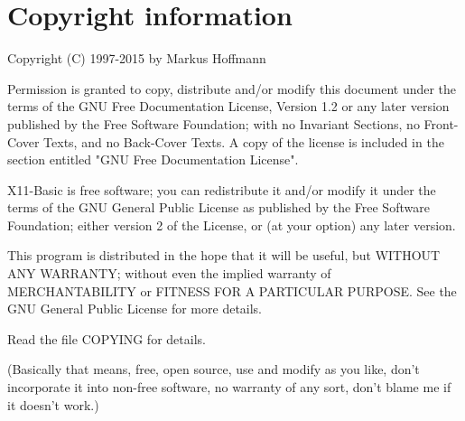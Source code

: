 \section*{Copyright information}

Copyright (C) 1997-2015 by Markus Hoffmann 

Permission is granted to copy, distribute and/or modify this document
under the terms of the GNU Free Documentation License, Version 1.2
or any later version published by the Free Software Foundation;
with no Invariant Sections, no Front-Cover Texts, and no Back-Cover Texts.
A copy of the license is included in the section entitled "GNU
Free Documentation License".

X11-Basic is free software; you can redistribute it and/or modify it under the
terms of the GNU General Public License as published by the Free Software
Foundation; either version 2 of the License, or (at your option) any later
version.

This program is distributed in the hope that it will be useful, but WITHOUT ANY
WARRANTY; without even the implied warranty of MERCHANTABILITY or FITNESS FOR
A PARTICULAR PURPOSE. See the GNU General Public License for more details.

Read the file COPYING for details.

(Basically that means, free, open source, use and modify as you like, don't
incorporate it into non-free software, no warranty of any sort, don't blame me
if it doesn't work.)
